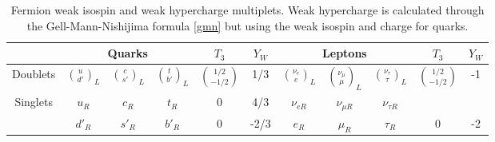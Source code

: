 \begin{center}
\begin{table}[h!]
\centering
\footnotesize
\begin{tabular}{ccccccccccc} \hline
                          &     \multicolumn{3}{c}{Quarks}                       & $T_3$              & $Y_W$&  \multicolumn{3}{c}{Leptons}                                              & $T_3$                    & $Y_W$\\\hline
Doublets                  & $\binom{u}{d'}_L$& $\binom{c}{s'}_L$& $\binom{t}{b'}_L$& $\binom{1/2}{-1/2}$& 1/3  & $\binom{\nu_e}{e}_L$ & $\binom{\nu_\mu}{\mu}_L$& $\binom{\nu_\tau}{\tau}_L$& $\binom{1/2}{-1/2}$ & -1    \\ %
\multirow{2}{*}{Singlets} & $u_R$            & $c_R$            & $t_R$            & 0                  & 4/3 & $\nu_{eR}$           & $\nu_{\mu R}$           & $\nu_{\tau R}$            &                     &       \\ %
                          & $d'_R$           & $s'_R$           & $b'_R$           & 0                  & -2/3 & $e_R$                & $\mu_R$                 & $\tau_R$                  & 0                   & -2   \\ \hline %
\end{tabular}
\caption[Fermion weak isospin and weak hypercharge multiplets.]{Fermion weak isospin and weak hypercharge multiplets. Weak hypercharge is calculated through the Gell-Mann-Nishijima formula \ref{gmn} but using the weak isospin and charge for quarks.}\label{T3Y}
\end{table}
\end{center}

